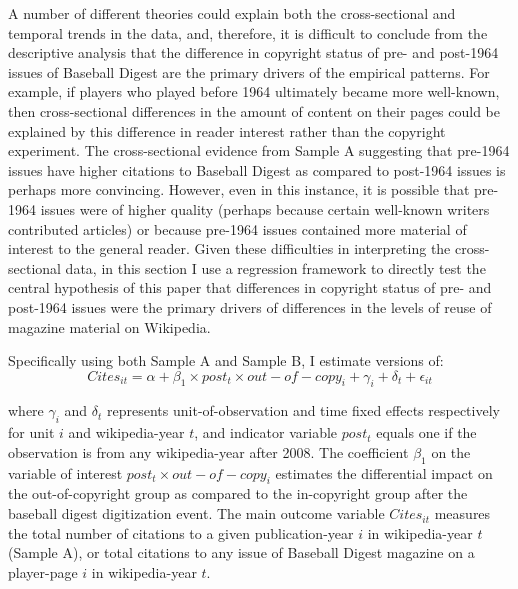 \documentclass[11pt]{article}
\begin{document}
A number of different theories could explain both the cross-sectional and temporal trends in the data, and, therefore, it is difficult to conclude from the descriptive analysis that the difference in copyright status of pre- and post-1964 issues of Baseball Digest are the primary drivers of the empirical patterns. For example, if players who played before 1964 ultimately became more well-known, then cross-sectional differences in the amount of content on their pages could be explained by this difference in reader interest rather than the copyright experiment. The cross-sectional evidence from Sample A suggesting that pre-1964 issues have higher citations to Baseball Digest as compared to post-1964 issues is perhaps more convincing. However, even in this instance, it is possible that pre-1964 issues were of higher quality (perhaps because certain well-known writers contributed articles) or because pre-1964 issues contained more material of interest to the general reader. Given these difficulties in interpreting the cross-sectional data, in this section I use a regression framework to directly test the central hypothesis of this paper that differences in copyright status of pre- and post-1964 issues were the primary drivers of differences in the levels of reuse of magazine material on Wikipedia.  

Specifically using both Sample A and Sample B, I estimate versions of: $$Cites_{it} = \alpha + \beta_1 \times post_t \times out-of-copy_i + \gamma_i+ \delta_t + \epsilon_{it}$$ 

where $\gamma_{i}$ and $\delta_{t}$ represents unit-of-observation and time fixed effects respectively for unit $i$ and wikipedia-year $t$, and indicator variable $post_t$ equals one if the observation is from any wikipedia-year after 2008. The coefficient $\beta_1$ on the variable of interest $post_t \times out-of-copy_i$ estimates the differential impact on the out-of-copyright group as compared to the in-copyright group after the baseball digest digitization event. The main outcome variable $Cites_{it}$ measures the total number of citations to a given publication-year $i$ in wikipedia-year $t$ (Sample A), or total citations to any issue of Baseball Digest magazine on a player-page $i$ in wikipedia-year $t$. 
\end{document}
